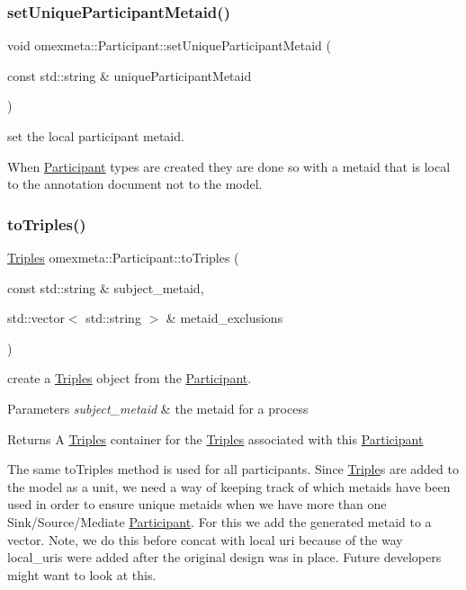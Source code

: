 \subsubsection{\texorpdfstring{set\+Unique\+Participant\+Metaid()}{setUniqueParticipantMetaid()}}
{\footnotesize\ttfamily void omexmeta\+::\+Participant\+::set\+Unique\+Participant\+Metaid (\begin{DoxyParamCaption}\item[{const std\+::string \&}]{unique\+Participant\+Metaid }\end{DoxyParamCaption})}



set the local participant metaid. 

When \hyperlink{classomexmeta_1_1Participant}{Participant} types are created they are done so with a metaid that is local to the annotation document not to the model. \mbox{\label{classomexmeta_1_1Participant_a6757eea8a56972eb369e0e102ae5bfc8}} 
\subsubsection{\texorpdfstring{to\+Triples()}{toTriples()}}
{\footnotesize\ttfamily \hyperlink{classomexmeta_1_1Triples}{Triples} omexmeta\+::\+Participant\+::to\+Triples (\begin{DoxyParamCaption}\item[{const std\+::string \&}]{subject\+\_\+metaid,  }\item[{std\+::vector$<$ std\+::string $>$ \&}]{metaid\+\_\+exclusions }\end{DoxyParamCaption})}



create a \hyperlink{classomexmeta_1_1Triples}{Triples} object from the \hyperlink{classomexmeta_1_1Participant}{Participant}. 


\begin{DoxyParams}{Parameters}
{\em subject\+\_\+metaid} & the metaid for a process \\
\hline
\end{DoxyParams}
\begin{DoxyReturn}{Returns}
A \hyperlink{classomexmeta_1_1Triples}{Triples} container for the \hyperlink{classomexmeta_1_1Triples}{Triples} associated with this \hyperlink{classomexmeta_1_1Participant}{Participant}
\end{DoxyReturn}
The same to\+Triples method is used for all participants. Since \hyperlink{classomexmeta_1_1Triple}{Triple}\textquotesingle{}s are added to the model as a unit, we need a way of keeping track of which metaids have been used in order to ensure unique metaid\textquotesingle{}s when we have more than one Sink/\+Source/\+Mediate \hyperlink{classomexmeta_1_1Participant}{Participant}. For this we add the generated metaid to a vector. Note, we do this before concat with local uri because of the way local\+\_\+uri\textquotesingle{}s were added after the original design was in place. Future developers might want to look at this.

